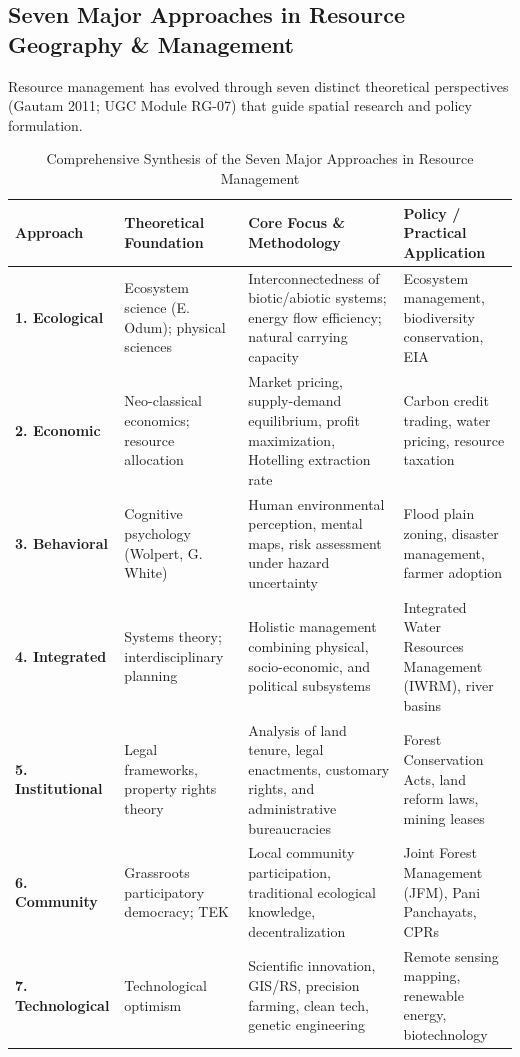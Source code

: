 \documentclass[11pt,a4paper]{article}
\begin{document}
\subsection{Seven Major Approaches in Resource Geography \& Management}

\begin{modelbox}
Resource management has evolved through seven distinct theoretical perspectives (Gautam 2011; UGC Module RG-07) that guide spatial research and policy formulation.
\end{modelbox}

\begin{table}[h!]
\centering
\small
\begin{tabularx}{\textwidth}{l X X X}
\toprule
\textbf{Approach} & \textbf{Theoretical Foundation} & \textbf{Core Focus \& Methodology} & \textbf{Policy / Practical Application} \\
\midrule
\textbf{1. Ecological} & Ecosystem science (E. Odum); physical sciences & Interconnectedness of biotic/abiotic systems; energy flow efficiency; natural carrying capacity & Ecosystem management, biodiversity conservation, EIA \\
\midrule
\textbf{2. Economic} & Neo-classical economics; resource allocation & Market pricing, supply-demand equilibrium, profit maximization, Hotelling extraction rate & Carbon credit trading, water pricing, resource taxation \\
\midrule
\textbf{3. Behavioral} & Cognitive psychology (Wolpert, G. White) & Human environmental perception, mental maps, risk assessment under hazard uncertainty & Flood plain zoning, disaster management, farmer adoption \\
\midrule
\textbf{4. Integrated} & Systems theory; interdisciplinary planning & Holistic management combining physical, socio-economic, and political subsystems & Integrated Water Resources Management (IWRM), river basins \\
\midrule
\textbf{5. Institutional} & Legal frameworks, property rights theory & Analysis of land tenure, legal enactments, customary rights, and administrative bureaucracies & Forest Conservation Acts, land reform laws, mining leases \\
\midrule
\textbf{6. Community} & Grassroots participatory democracy; TEK & Local community participation, traditional ecological knowledge, decentralization & Joint Forest Management (JFM), Pani Panchayats, CPRs \\
\midrule
\textbf{7. Technological} & Technological optimism & Scientific innovation, GIS/RS, precision farming, clean tech, genetic engineering & Remote sensing mapping, renewable energy, biotechnology \\
\bottomrule
\end{tabularx}
\caption{Comprehensive Synthesis of the Seven Major Approaches in Resource Management}
\end{table}
\end{document}
